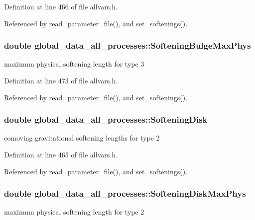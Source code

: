 Definition at line 466 of file allvars.h.



Referenced by read\_\-parameter\_\-file(), and set\_\-softenings().

\hypertarget{structglobal__data__all__processes_a215c28ea2e54629e8537bd9868401fa7}{
\subsubsection[{SofteningBulgeMaxPhys}]{\setlength{\rightskip}{0pt plus 5cm}double {\bf global\_\-data\_\-all\_\-processes::SofteningBulgeMaxPhys}}}
\label{structglobal__data__all__processes_a215c28ea2e54629e8537bd9868401fa7}
maximum physical softening length for type 3 

Definition at line 473 of file allvars.h.



Referenced by read\_\-parameter\_\-file(), and set\_\-softenings().

\hypertarget{structglobal__data__all__processes_a4a4453f9f76bb91ff3418d864caf3222}{
\subsubsection[{SofteningDisk}]{\setlength{\rightskip}{0pt plus 5cm}double {\bf global\_\-data\_\-all\_\-processes::SofteningDisk}}}
\label{structglobal__data__all__processes_a4a4453f9f76bb91ff3418d864caf3222}
comoving gravitational softening lengths for type 2 

Definition at line 465 of file allvars.h.



Referenced by read\_\-parameter\_\-file(), and set\_\-softenings().

\hypertarget{structglobal__data__all__processes_a575a685feed5223ffc7c5b42b2b369b9}{
\subsubsection[{SofteningDiskMaxPhys}]{\setlength{\rightskip}{0pt plus 5cm}double {\bf global\_\-data\_\-all\_\-processes::SofteningDiskMaxPhys}}}
\label{structglobal__data__all__processes_a575a685feed5223ffc7c5b42b2b369b9}
maximum physical softening length for type 2 

